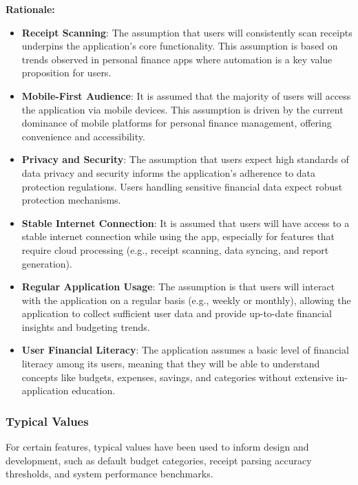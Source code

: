\documentclass[12pt]{article}
\begin{document}
\noindent\textbf{Rationale:}
\begin{itemize}
    \item \textbf{Receipt Scanning}: The assumption that users will consistently
    scan receipts underpins the application's core functionality. This assumption is
    based on trends observed in personal finance apps where automation is a key
    value proposition for users.
    \item \textbf{Mobile-First Audience}: It is assumed that the majority of
    users will access the application via mobile devices. This assumption is
    driven by the current dominance of mobile platforms for personal finance
    management, offering convenience and accessibility.
    \item \textbf{Privacy and Security}: The assumption that users expect high
    standards of data privacy and security informs the application's adherence to
    data protection regulations. Users handling sensitive financial data expect
    robust protection mechanisms.
    \item \textbf{Stable Internet Connection}: It is assumed that users will
    have access to a stable internet connection while using the app, especially
    for features that require cloud processing (e.g., receipt scanning, data
    syncing, and report generation).
    \item \textbf{Regular Application Usage}: The assumption is that users will
    interact with the application on a regular basis (e.g., weekly or monthly),
    allowing the application to collect sufficient user data and provide
    up-to-date financial insights and budgeting trends.
    \item \textbf{User Financial Literacy}: The application assumes a basic
    level of financial literacy among its users, meaning that they will be able
    to understand concepts like budgets, expenses, savings, and categories
    without extensive in-application education.
\end{itemize}

\subsubsection{Typical Values}
For certain features, typical values have been used to inform design and development, such as default budget categories, receipt parsing accuracy thresholds, and system performance benchmarks.\\
\end{document}
